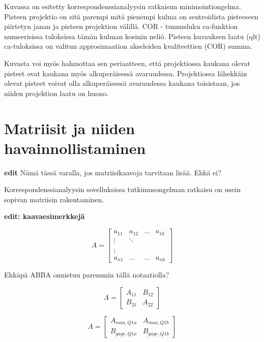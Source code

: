 \documentclass[
  finnish,
]{book}
\begin{document}
Kuvassa on esitetty korrespondenssianalyysin ratkaisun minimointiongelma. Pisteen
projektio on sitä parempi mitä pienempi kulma on sentroidista pisteeseen
piirtetyn janan ja pisteen projektion välillä. COR - tunnusluku ca-funktion
numeerisissa tuloksissa tämän kulman kosinin neliö. Pisteen kuvauksen laatu (qlt)
ca-tuloksissa on valitun approsimaation akseleiden kvaliteettien (COR) summa.

Kuvasta voi myös hahmottaa sen periaatteen, että projektiossa kaukana olevat
pisteet ovat kaukana myös alkuperäisessä avaruudessa. Projektiossa lähekkäin
olevat pisteet voivat olla alkuperäisessä avaruudessa kaukana toisistaan,
jos niiden projektion laatu on huono.

\hypertarget{matriisit-ja-niiden-havainnollistaminen}{%
\section*{Matriisit ja niiden havainnollistaminen}\label{matriisit-ja-niiden-havainnollistaminen}}

\textbf{edit} Nämä tässä varalla, jos matriisikaavoja tarvitaan lisää. Ehkä ei?

Korrespondenssianalyysin sovelluksissa tutkimusongelman ratkaisu on usein sopivan
matriisin rakentaminen.

\textbf{edit: kaavaesimerkkejä}

\begin{equation}
A = \begin{bmatrix}
    a_{11} & a_{12} & \dots & a_{1k}\\
    \vdots & \ddots & \\
    \\
    \vdots \\
    a_{n1} & \dots  & \dots & a_{nk}
    \end{bmatrix}
\end{equation}

Ehkäpä ABBA onnistuu paremmin tällä notaatiolla?

\begin{equation}
A = \begin{bmatrix}
    A_{11} & B_{12}  \\
    B_{21} & A_{22}
    \end{bmatrix}
\end{equation}

\begin{equation}
A = \begin{bmatrix}
    A_{maa, Q1a} & A_{maa, Q1b}  \\
    B_{gage, Q1a} & B_{gage, Q1b}
    \end{bmatrix}
\end{equation}
\end{document}
